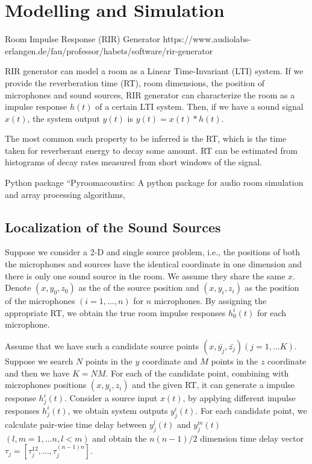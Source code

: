 \documentclass[journal]{IEEEtran}
\begin{document}
\section{Modelling and Simulation}
Room Impulse Response (RIR) Generator
{https://www.audiolabs-erlangen.de/fau/professor/habets/software/rir-generator}

RIR generator can model a room as a Linear Time-Invariant (LTI) system. If we provide the reverberation time (RT), room dimensions, the position of microphones and sound sources, RIR generator can characterize the room as a impulse response $h(t)$ of a certain LTI system. Then, if we have a sound signal $x(t)$, the system output $y(t)$ is $y(t) = x(t) * h(t)$. 

The most common such property to be inferred is the RT, which is the time taken for reverberant energy to decay some amount.  RT can be estimated from histograms of decay rates measured from short windows of the signal.\cite{ratnam2003blind}

Python package “Pyroomacoustics: A python package for audio room simulation and array processing algorithms,\cite{Scheibler2018}

\subsection{Localization of the Sound Sources}
Suppose we consider a 2-D and single source problem, i.e., the positions of both the microphones and sources have the identical coordinate in one dimension and there is only one sound source in the room. We assume they share the same $x$. Denote  $(x, y_0, z_0)$ as the  of the source position and $(x, y_i, z_i)$ as the position of the microphones $(i = 1, \ldots , n)$ for $n$  microphones. By assigning the appropriate RT, we  obtain the true room impulse responses $h_0^i(t)$ for each microphone. 

Assume that we have such a candidate source points  $(x, \bar{y_j}, \bar{z_j}) (j = 1, \ldots K)$. Suppose we  search $N$ points in the $y$ coordinate and $M$ points in the $z$ coordinate and then we have $K = NM$. For each of the candidate point, combining with microphones positions $(x, y_i, z_i)$ and the given RT, it can generate a impulse response $h_j^i(t)$. Consider a source input $x(t)$, by applying different impulse responses $h_j^i(t)$, we obtain system outputs $y_j^i(t)$. For each candidate point, we calculate pair-wise time delay between $y_j^l(t)$ and $y_j^m(t)$ $(l,m = 1,\ldots n, l < m)$ and obtain the $n(n-1)/2$ dimension time delay vector $\tau_{j} = [\tau_j^{12}, \ldots, \tau_j^{(n-1)n}]$. 
\end{document}
